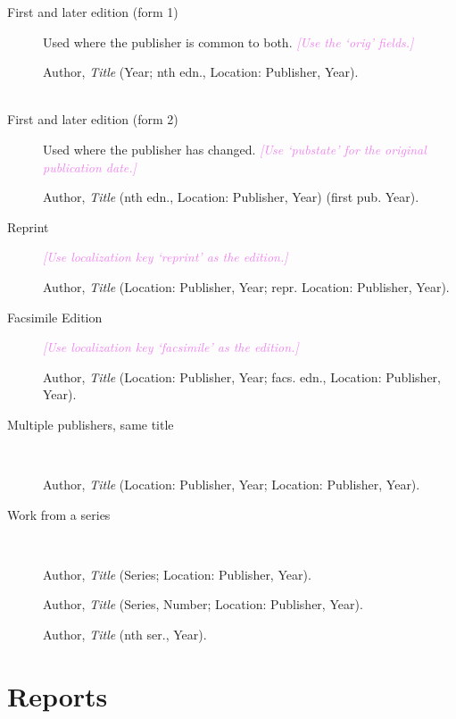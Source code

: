 \documentclass[extrafontsizes,11pt,a4paper,oneside]{memoir}
\newcommand*{\lit}[1]{\textsf{#1}}
\newcommand*{\code}[1]{`\textsf{#1}'}
\newcommand*{\aside}[1]{\textcolor{violet}{\emph{[#1]}}}
\begin{document}
\begin{description}
  \item[First and later edition (form 1)] Used where the publisher is common to both. \aside{Use the \code{orig} fields.}
  \par Author, \emph{Title} (Year; nth \lit{edn.}, Location: Publisher, Year).
  \\
  \\
  
  \item[First and later edition (form 2)] Used where the publisher has changed. \aside{Use \code{pubstate} for the original publication date.}
  \par Author, \emph{Title} (nth \lit{edn.}, Location: Publisher, Year) (\lit{first pub.} Year).
  \\
  
  \item[Reprint] \aside{Use localization key \code{reprint} as the edition.}\par 
  Author, \emph{Title} (Location: Publisher, Year; \lit{repr.} Location: Publisher, Year).
  \\
  
  \item[Facsimile Edition] \aside{Use localization key \code{facsimile} as the edition.}\par 
  Author, \emph{Title} (Location: Publisher, Year; \lit{facs. edn.}, Location: Publisher, Year).
  \\
  
  \item[Multiple publishers, same title]~\par 
  Author, \emph{Title} (Location: Publisher, Year; Location: Publisher, Year).
  \\
  
  \item[Work from a series]~
  \par Author, \emph{Title} (Series; Location: Publisher, Year).
  \par Author, \emph{Title} (Series, Number; Location: Publisher, Year).
  \\
  \par Author, \emph{Title} (nth \lit{ser.}, Year).
\end{description}

\section{Reports}\label{sec:report}
\end{document}
